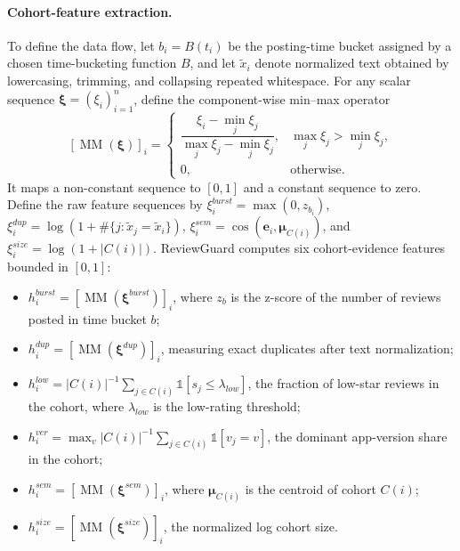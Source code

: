 \documentclass[runningheads]{llncs}
\begin{document}
\paragraph{Cohort-feature extraction.}
To define the data flow, let \(b_i=B(t_i)\) be the posting-time bucket assigned by a chosen time-bucketing function \(B\), and let \(\tilde{x}_i\) denote normalized text obtained by lowercasing, trimming, and collapsing repeated whitespace. For any scalar sequence \(\boldsymbol{\xi}=(\xi_i)_{i=1}^{n}\), define the component-wise min--max operator
\[
[\operatorname{MM}(\boldsymbol{\xi})]_i=
\begin{cases}
\dfrac{\xi_i-\min_j \xi_j}{\max_j \xi_j-\min_j \xi_j},
& \max_j \xi_j>\min_j \xi_j,\\[2mm]
0, & \text{otherwise}.
\end{cases}
\]
It maps a non-constant sequence to \([0,1]\) and a constant sequence to zero. Define the raw feature sequences by \(\xi_i^{burst}=\max(0,z_{b_i})\), \(\xi_i^{dup}=\log(1+\#\{j:\tilde{x}_j=\tilde{x}_i\})\), \(\xi_i^{sem}=\cos(\mathbf{e}_i,\boldsymbol{\mu}_{C(i)})\), and \(\xi_i^{size}=\log(1+|C(i)|)\). ReviewGuard computes six cohort-evidence features bounded in \([0,1]\):
\begin{itemize}
    \item \(h_i^{burst}=[\operatorname{MM}(\boldsymbol{\xi}^{burst})]_i\), where \(z_b\) is the z-score of the number of reviews posted in time bucket \(b\);
    \item \(h_i^{dup}=[\operatorname{MM}(\boldsymbol{\xi}^{dup})]_i\), measuring exact duplicates after text normalization;
    \item \(h_i^{low}=|C(i)|^{-1}\sum_{j\in C(i)}\mathbb{1}[s_j\le \lambda_{low}]\), the fraction of low-star reviews in the cohort, where \(\lambda_{low}\) is the low-rating threshold;
    \item \(h_i^{ver}=\max_v |C(i)|^{-1}\sum_{j\in C(i)}\mathbb{1}[v_j=v]\), the dominant app-version share in the cohort;
    \item \(h_i^{sem}=[\operatorname{MM}(\boldsymbol{\xi}^{sem})]_i\), where \(\boldsymbol{\mu}_{C(i)}\) is the centroid of cohort \(C(i)\);
    \item \(h_i^{size}=[\operatorname{MM}(\boldsymbol{\xi}^{size})]_i\), the normalized log cohort size.
\end{itemize}
\end{document}
